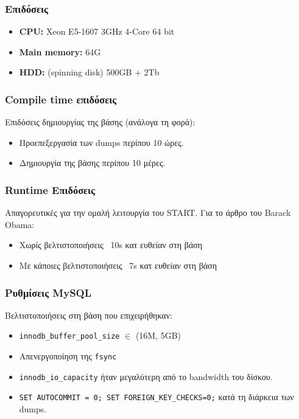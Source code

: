 \documentclass[bigger]{beamer}
\begin{document}

\begin{frame}
  \frametitle{Επιδόσεις}
  \begin{itemize}
  \item \textbf{CPU:} Xeon E5-1607 3GHz 4-Core 64 bit
  \item \textbf{Main memory:} 64G
  \item \textbf{HDD:} (spinning disk) 500GB + 2Tb
  \end{itemize}
\end{frame}

\begin{frame}
  \frametitle{Compile time επιδόσεις}
  Επιδόσεις δημιουργίας της βάσης (ανάλογα τη φορά):

  \begin{itemize}
  \item Προεπεξεργασία των dumps περίπου 10 ώρες.
  \item Δημιουργία της βάσης περίπου 10 μέρες.
  \end{itemize}
\end{frame}

\begin{frame}
  \frametitle{Runtime Επιδόσεις}

  Απαγορευτικές για την ομαλή λειτουργία του START. Για το άρθρο του
  Barack Obama:
  \begin{itemize}
  \item Χωρίς βελτιστοποιήσεις ~10s κατ ευθείαν στη βάση
  \item Με κάποιες βελτιστοποιήσεις ~7s κατ ευθείαν στη βάση
  \end{itemize}
\end{frame}

\begin{frame}
  \frametitle{Ρυθμίσεις MySQL}

  Βελτιστοποιήσεις στη βάση που επιχειρήθηκαν:

  \begin{itemize}
  \item \texttt{innodb\_buffer\_pool\_size} \(\in\) (16Μ, 5GB)
  \item Απενεργοποίηση της \texttt{fsync}
  \item \texttt{innodb\_io\_capacity} ήταν μεγαλύτερη από το bandwidth
    του δίσκου.
  \item \texttt{SET AUTOCOMMIT = 0; SET FOREIGN\_KEY\_CHECKS=0;} κατά τη
    διάρκεια των dumps.
  \end{itemize}
\end{frame}
\end{document}
